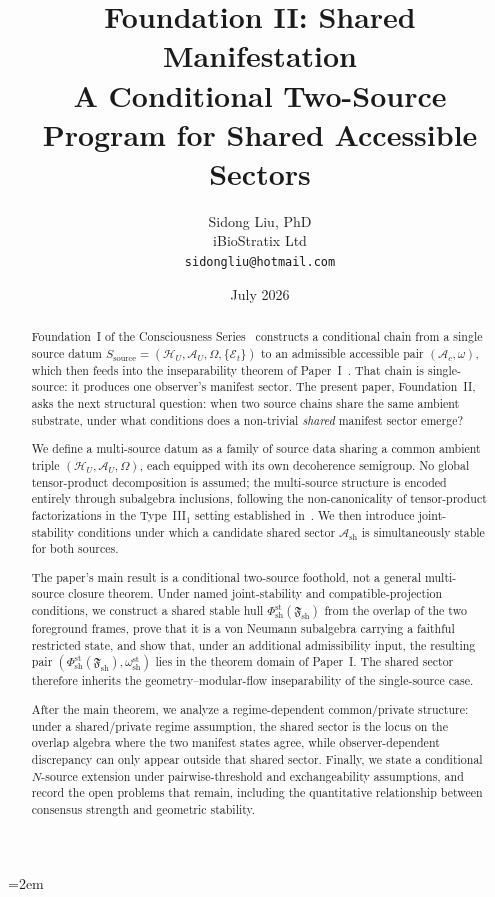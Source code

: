 \documentclass[12pt]{article}
\title{%
  \textbf{Foundation II: Shared Manifestation}\\
  \textbf{A Conditional Two-Source Program for Shared Accessible Sectors}%
}
\author{
  Sidong Liu, PhD \\
  \small iBioStratix Ltd \\
  \small \texttt{sidongliu@hotmail.com}
}
\date{July 2026}
\theoremstyle{definition}
\theoremstyle{remark}
\begin{document}
\emergencystretch=2em
\raggedbottom
{}

\maketitle

\begin{abstract}
Foundation~I of the Consciousness Series~\cite{FoundationI} constructs a
conditional chain from a single source datum
\(S_{\mathrm{source}}=(\mathcal H_U,\mathcal A_U,\Omega,\{\mathcal E_t\})\)
to an admissible accessible pair \((\mathcal A_c,\omega)\), which then
feeds into the inseparability theorem of Paper~I~\cite{PaperI}. That
chain is single-source: it produces one observer's manifest sector. The
present paper, Foundation~II, asks the next structural question: when two
source chains share the same ambient substrate, under what conditions
does a non-trivial \emph{shared} manifest sector emerge?

We define a multi-source datum as a family of source data sharing a
common ambient triple \((\mathcal H_U,\mathcal A_U,\Omega)\), each
equipped with its own decoherence semigroup. No global tensor-product
decomposition is assumed; the multi-source structure is encoded entirely
through subalgebra inclusions, following the non-canonicality of
tensor-product factorizations in the Type~III\(_1\) setting established
in~\cite{HAFFA}. We then introduce joint-stability conditions under
which a candidate shared sector \(\mathcal A_{\mathrm{sh}}\) is
simultaneously stable for both sources.

The paper's main result is a conditional two-source foothold, not a
general multi-source closure theorem. Under named joint-stability and
compatible-projection conditions, we construct a
shared stable hull
\(\Phi_{\mathrm{sh}}^{\mathrm{st}}(\mathfrak F_{\mathrm{sh}})\) from
the overlap of the two foreground frames, prove that it is a von Neumann
subalgebra carrying a faithful restricted state, and show that, under an
additional admissibility input, the resulting pair
\((\Phi_{\mathrm{sh}}^{\mathrm{st}}(\mathfrak F_{\mathrm{sh}}),
\omega_{\mathrm{sh}}^{\mathrm{st}})\) lies in the theorem domain of
Paper~I. The
shared sector therefore inherits the
geometry--modular-flow inseparability of the single-source case.

After the main theorem, we analyze a regime-dependent common/private
structure: under a shared/private regime assumption, the shared sector
is the locus on the overlap algebra where the two manifest states agree,
while observer-dependent discrepancy can only appear outside that shared
sector. Finally, we state a conditional \(N\)-source extension under
pairwise-threshold and exchangeability assumptions, and record the open
problems that remain, including the quantitative relationship between
consensus strength and geometric stability.


\end{abstract}
\end{document}
